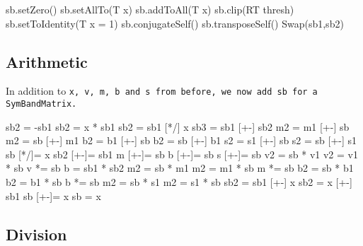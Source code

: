\begin{tmvcode}
sb.setZero()
sb.setAllTo(T x)
sb.addToAll(T x)
sb.clip(RT thresh)
sb.setToIdentity(T x = 1)
sb.conjugateSelf()
sb.transposeSelf()
Swap(sb1,sb2)
\end{tmvcode}
\vspace{12pt}

\subsection{Arithmetic}
\label{SymBandMatrix_Arithmetic}

In addition to \tt{x}, \tt{v}, \tt{m}, \tt{b} and \tt{s} from before, 
we now add \tt{sb} for a \tt{SymBandMatrix}.

\begin{tmvcode}
sb2 = -sb1
sb2 = x * sb1
sb2 = sb1 [*/] x
sb3 = sb1 [+-] sb2
m2 = m1 [+-] sb
m2 = sb [+-] m1
b2 = b1 [+-] sb
b2 = sb [+-] b1
s2 = s1 [+-] sb
s2 = sb [+-] s1
sb [*/]= x
sb2 [+-]= sb1
m [+-]= sb
b [+-]= sb
s [+-]= sb
v2 = sb * v1
v2 = v1 * sb
v *= sb
b = sb1 * sb2
m2 = sb * m1
m2 = m1 * sb
m *= sb
b2 = sb * b1
b2 = b1 * sb
b *= sb
m2 = sb * s1
m2 = s1 * sb
sb2 = sb1 [+-] x
sb2 = x [+-] sb1
sb [+-]= x
sb = x
\end{tmvcode}

\subsection{Division}
\label{SymBandMatrix_Division}

